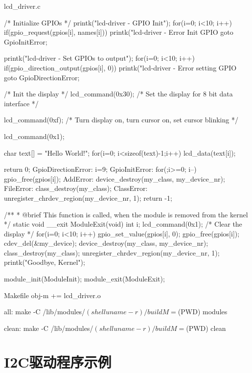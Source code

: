 \documentclass[lang=cn,newtx,10pt,scheme=chinese]{elegantbook}
\begin{document}
\begin{mycode}{lcd\_driver.c}
{    /* Initialize GPIOs */
    printk("lcd-driver - GPIO Init\n");
    for(i=0; i<10; i++) {
        if(gpio_request(gpios[i], names[i])) {
            printk("lcd-driver - Error Init GPIO %
            goto GpioInitError;
        }
    }

    printk("lcd-driver - Set GPIOs to output\n");
    for(i=0; i<10; i++) {
        if(gpio_direction_output(gpios[i], 0)) {
            printk("lcd-driver - Error setting GPIO %
            goto GpioDirectionError;
        }
    }

    /* Init the display */
    lcd_command(0x30);    /* Set the display for 8 bit data interface */

    lcd_command(0xf);    /* Turn display on, turn cursor on, set cursor blinking */

    lcd_command(0x1);

    char text[] = "Hello World!";
    for(i=0; i<sizeof(text)-1;i++)
        lcd_data(text[i]);

    return 0;
GpioDirectionError:
    i=9;
GpioInitError:
    for(;i>=0; i--)
        gpio_free(gpios[i]);
AddError:
    device_destroy(my_class, my_device_nr);
FileError:
    class_destroy(my_class);
ClassError:
    unregister_chrdev_region(my_device_nr, 1);
    return -1;
}

/**
 * @brief This function is called, when the module is removed from the kernel
 */
static void __exit ModuleExit(void) {
    int i;
    lcd_command(0x1);    /* Clear the display */
    for(i=0; i<10; i++){
        gpio_set_value(gpios[i], 0);
        gpio_free(gpios[i]);
    }
    cdev_del(&my_device);
    device_destroy(my_class, my_device_nr);
    class_destroy(my_class);
    unregister_chrdev_region(my_device_nr, 1);
    printk("Goodbye, Kernel\n");
}

module_init(ModuleInit);
module_exit(ModuleExit);
\end{mycode}

\begin{mycode}{Makefile}
obj-m += lcd_driver.o

all:
    make -C /lib/modules/$(shell uname -r)/build M=$(PWD) modules

clean:
    make -C /lib/modules/$(shell uname -r)/build M=$(PWD) clean
\end{mycode}

\chapter{I2C驱动程序示例}
\end{document}
